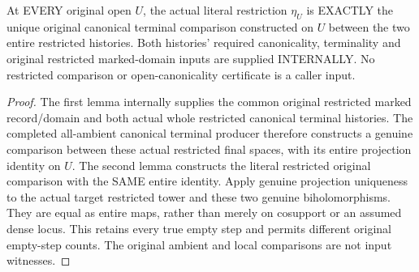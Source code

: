 \begin{theorem}
\label{hir:original-terminal-open-comparison-intrinsic-naturality}
\leanok
At EVERY original open $U$, the actual literal restriction $\eta_U$
is EXACTLY the unique original canonical terminal comparison constructed
on $U$ between the two entire restricted histories. Both histories'
required canonicality, terminality and original restricted marked-domain
inputs are supplied INTERNALLY. No restricted comparison or open-canonicality
certificate is a caller input.
\end{theorem}
\begin{proof}
The first lemma internally supplies the common original restricted marked
record/domain and both actual whole restricted canonical terminal histories.
The completed all-ambient canonical terminal producer therefore constructs
a genuine comparison between these actual restricted final spaces, with
its entire projection identity on $U$. The second lemma constructs the
literal restricted original comparison with the SAME entire identity.
Apply genuine projection uniqueness to the actual target restricted
tower and these two genuine biholomorphisms. They are equal as entire
maps, rather than merely on cosupport or an assumed dense locus. This
retains every true empty step and permits different original empty-step
counts. The original ambient and local comparisons are not input witnesses.
\end{proof}

